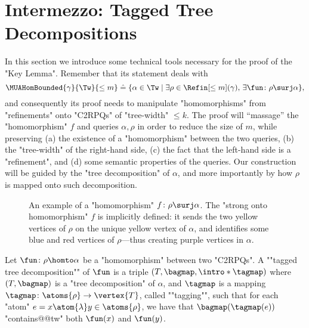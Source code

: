 \section{\AP{}Intermezzo: Tagged Tree Decompositions}
\label{sec:treedec}

In this section we introduce some technical tools necessary for the proof of
the "Key Lemma". Remember that its statement deals with
\[
	\MUAHomBounded{\gamma}{\Tw}{\leq m} \defeq 
    \{ 
        \alpha \in \Tw
        \mid
        \exists \rho \in \Refin[\leq m](\gamma),\, \exists \fun\colon \rho \surj \alpha
    \},
\]
and consequently its proof needs to manipulate "homomorphisms"
from "refinements" onto "C2RPQs" of "tree-width" $\leq k$.
The proof will ``massage'' the "homomorphism" $f$ and queries $\alpha,\rho$ in order to reduce the size of $m$, while preserving (a) the existence of a "homomorphism" between the two queries,
(b) the "tree-width" of the right-hand side, (c) the fact that the left-hand side is a "refinement",
and (d) some semantic properties of the queries. Our construction will be guided by
the "tree decomposition" of $\alpha$, and more importantly by how $\rho$ is mapped onto such decomposition.

\begin{figure}[tbp]
	\centering
	\hfill
	\hfill
	\caption{
		\AP\label{fig:trio}
		An example of a "homomorphism" $f\colon \rho \surj \alpha$.
		The "strong onto homomorphism" $f$ is implicitly defined: it sends the two yellow
		vertices of $\rho$ on the unique yellow vertex of $\alpha$, and identifies some
		blue and red vertices of $\rho$---thus creating purple vertices in $\alpha$.
	}
\end{figure}

\begin{definition}
    \AP Let $\fun\colon \rho \homto \alpha$ be a "homomorphism" between two "C2RPQs".
    A ""tagged tree decomposition""
    of $\fun$ is a triple $(T, \bagmap, \intro*\tagmap)$ where
    $(T, \bagmap)$ is a "tree decomposition" of $\alpha$,
    and $\tagmap$ is a mapping $\tagmap\colon \atoms{\rho} \to \vertex{T}$, called \AP""tagging"",
    such that for each "atom" $e = x \atom{\lambda} y \in \atoms{\rho}$, we have that $\bagmap(\tagmap(e))$ "contains@@tw" both $\fun(x)$ and
    $\fun(y)$.
\end{definition}

